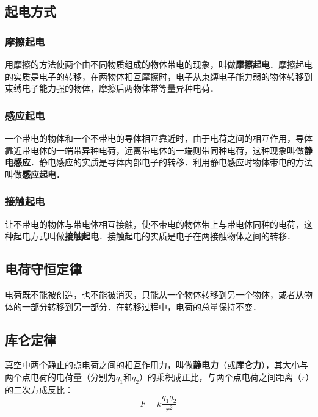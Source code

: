 \subsection{起电方式}

\subsubsection{摩擦起电}

用摩擦的方法使两个由不同物质组成的物体带电的现象，叫做\textbf{摩擦起电}．摩擦起电的实质是电子的转移，在两物体相互摩擦时，电子从束缚电子能力弱的物体转移到束缚电子能力强的物体，摩擦后两物体带等量异种电荷．

\subsubsection{感应起电}

一个带电的物体和一个不带电的导体相互靠近时，由于电荷之间的相互作用，导体靠近带电体的一端带异种电荷，远离带电体的一端则带同种电荷，这种现象叫做\textbf{静电感应}．静电感应的实质是导体内部电子的转移．利用静电感应时物体带电的方法叫做\textbf{感应起电}．

\subsubsection{接触起电}

让不带电的物体与带电体相互接触，使不带电的物体带上与带电体同种的电荷，这种起电方式叫做\textbf{接触起电}．接触起电的实质是电子在两接触物体之间的转移．

\subsection{电荷守恒定律}

电荷既不能被创造，也不能被消灭，只能从一个物体转移到另一个物体，或者从物体的一部分转移到另一部分．在转移过程中，电荷的总量保持不变．

\subsection{库仑定律}

真空中两个静止的点电荷之间的相互作用力，叫做\textbf{静电力}（或\textbf{库仑力}），其大小与两个点电荷的电荷量（分别为$q_1$和$q_2$）的乘积成正比，与两个点电荷之间距离（$r$）的二次方成反比：
\begin{equation}\label{HSPE01_eq1}
F=k \frac{q_1 q_2}{r^2}
\end{equation}

